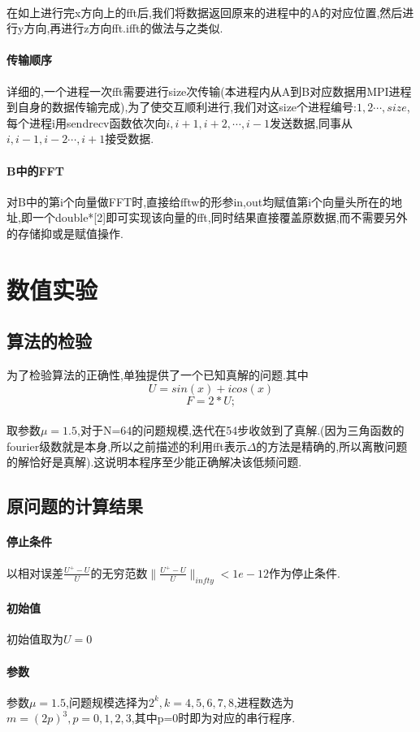 \documentclass[UTF8]{ctexart}
\begin{document}
\paragraph{}
在如上进行完x方向上的fft后,我们将数据返回原来的进程中的A的对应位置,然后进行y方向,再进行z方向fft.ifft的做法与之类似.
\paragraph{传输顺序}
详细的,一个进程一次fft需要进行size次传输(本进程内从A到B对应数据用MPI进程到自身的数据传输完成),为了使交互顺利进行,我们对这size个进程编号:$1,2\cdots,size$,每个进程i用sendrecv函数依次向$i,i+1,i+2,\cdots,i-1$发送数据,同事从$i,i-1,i-2\cdots,i+1$接受数据.
\paragraph{B中的FFT}
对B中的第i个向量做FFT时,直接给fftw的形参in,out均赋值第i个向量头所在的地址,即一个double*[2]即可实现该向量的fft,同时结果直接覆盖原数据,而不需要另外的存储抑或是赋值操作.
\section{数值实验}
\subsection{算法的检验}
为了检验算法的正确性,单独提供了一个已知真解的问题.其中
$$
U = sin(x) + icos(x) 
$$
$$
F = 2*U;
$$
\paragraph{}
取参数$\mu=1.5$,对于N=64的问题规模,迭代在54步收敛到了真解.(因为三角函数的fourier级数就是本身,所以之前描述的利用fft表示$\Delta$的方法是精确的,所以离散问题的解恰好是真解).这说明本程序至少能正确解决该低频问题.
\subsection{原问题的计算结果}
\paragraph{停止条件}
以相对误差$\frac{U^{+}-U}{U}$的无穷范数$\|\frac{U^{+}-U}{U}\|_{infty}<1e-12$作为停止条件.
\paragraph{初始值}
初始值取为$U=0$
\paragraph{参数}
参数$\mu=1.5$,问题规模选择为$2^k,k=4,5,6,7,8$,进程数选为$m=(2p)^3,p=0,1,2,3$,其中p=0时即为对应的串行程序.
\end{document}
